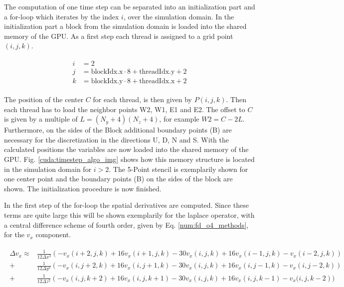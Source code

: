 The computation of one time step can be separated into an initialization part and a for-loop which iterates by the index $i$, over the simulation domain.
In the initialization part a block from the simulation domain is loaded into the shared memory of the GPU.
As a first step each thread is assigned to a grid point $(i, j, k)$.

\begin{align}
    \begin{split}
    i &= 2\\
    j &= \text{blockIdx.x}\cdot 8 + \text{threadIdx.y} + 2\\
    k &= \text{blockIdx.y}\cdot 8 + \text{threadIdx.x} + 2
    \end{split}
\end{align}

The position of the center $C$ for each thread, is then given by $P(i, j, k)$.
Then each thread has to load the neighbor points W2, W1, E1 and E2.
The offset to $C$ is given by a multiple of ${L=(N_y+4)(N_z+4)}$, for example ${W2= C - 2L}$.
Furthermore, on the sides of the Block additional boundary points (B) are necessary for the discretization
in the directions U, D, N and S.
With the calculated positions the variables are now loaded into the shared memory of the GPU.
Fig. \ref{cuda:timestep_algo_img} shows how this memory structure is located in the simulation domain  for $i>2$.
The 5-Point stencil is exemplarily shown for one center point and the boundary points (B) on the sides of the block are shown.
The initialization procedure is now finished.

In the first step of the for-loop the spatial derivatives are computed.
Since these terms are quite large this will be shown exemplarily for the laplace operator,
with a central difference scheme of fourth order, given by Eq. \ref{num:fd_o4_methods}, for the $v_x$ component.

\begin{align}
    \begin{split}
    \Delta v_x   \approx &  \frac{1}{12\Delta x^2} \left(-v_x(i+2, j, k) + 16v_x(i+1, j, k) - 30v_x(i, j, k) + 16v_x(i-1, j, k)-v_x(i-2, j, k)\right)\\
                              +&  \frac{1}{12\Delta y^2} \left(-v_x(i, j+2, k) + 16v_x(i, j+1, k) - 30v_x(i, j, k) + 16v_x(i, j-1, k)-v_x(i, j-2, k)\right)\\
                              +&  \frac{1}{12\Delta z^2} \left(-v_x(i, j, k+2) + 16v_x(i, j, k+1) - 30v_x(i, j, k) + 16v_x(i, j, k-1)-v_x(i, j, k-2\right))
    \end{split}
\end{align}

